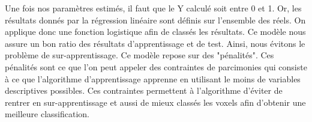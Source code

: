 Une fois nos paramètres estimés, il faut que le Y calculé soit entre 0 et 1. Or, les résultats donnés par la régression linéaire sont définis sur l'ensemble des réels. On applique donc une fonction logistique afin de classés les résultats. 
Ce modèle nous assure un bon ratio des résultats d'apprentissage et de test. Ainsi, nous évitons le problème de sur-apprentissage. 
Ce modèle repose sur des "pénalités". Ces pénalités sont ce que l'on peut appeler des contraintes de parcimonies qui consiste à ce que l'algorithme d'apprentissage apprenne en utilisant le moins de variables descriptives possibles. Ces contraintes permettent à l'algorithme d'éviter de rentrer en sur-apprentissage et aussi de mieux classés les voxels afin d'obtenir une meilleure classification.